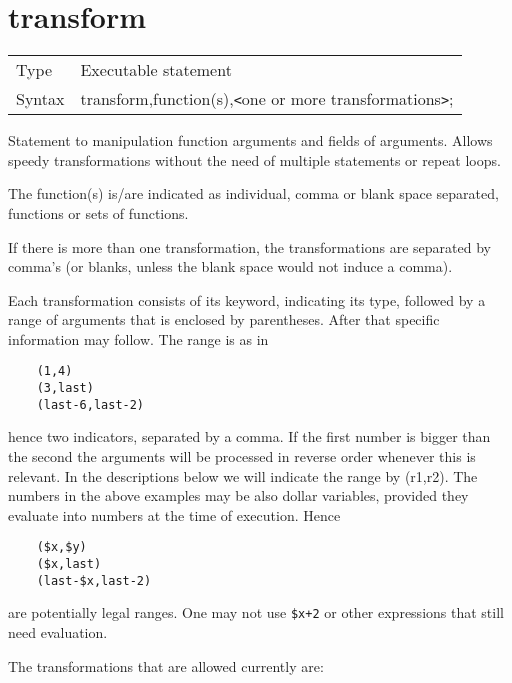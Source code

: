  
\section{transform}
\label{substatransform}

\noindent \begin{tabular}{ll}
Type & Executable statement\\
Syntax & transform,function(s),{\tt<}one or more transformations{\tt>};
\end{tabular} \vspace{4mm}

\noindent Statement to manipulation function arguments and 
fields of arguments. Allows speedy transformations without the need of 
multiple statements or repeat loops.

The function(s) is/are indicated as individual, comma or blank space 
separated, functions or sets of functions.

If there is more than one transformation, the transformations are separated 
by comma's (or blanks, unless the blank space would not induce a comma).

Each transformation consists of its keyword, indicating its type, followed 
by a range of arguments that is enclosed by parentheses. After that 
specific information may follow. The range is as 
in
\begin{verbatim}
	(1,4)
	(3,last)
	(last-6,last-2)
\end{verbatim}
hence two indicators, separated by a comma. If the first number is bigger 
than the second the arguments will be processed in reverse order whenever 
this is relevant. In the descriptions below we will indicate the range by 
(r1,r2). The numbers in the above examples may be also dollar variables, 
provided they evaluate into numbers at the time of execution. Hence
\begin{verbatim}
	($x,$y)
	($x,last)
	(last-$x,last-2)
\end{verbatim}
are potentially legal ranges. One may not use \verb:$x+2: or other 
expressions that still need evaluation.

The transformations that are allowed currently are:
 

